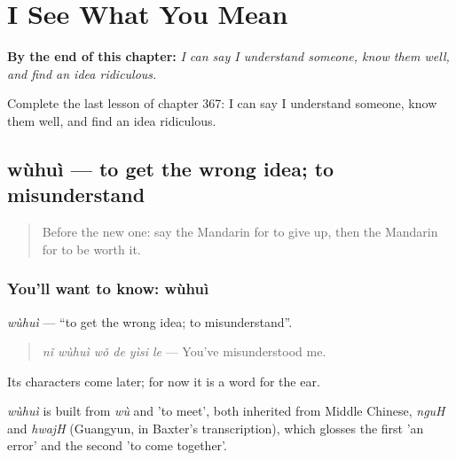 
\chapter{I See What You Mean}
\label{ch:zh-i-see-what-you-mean}

\begin{chapteropening}
\textbf{By the end of this chapter:} \emph{I can say I understand someone, know them well, and find an idea ridiculous.}

Complete the last lesson of chapter 367: I can say I understand someone, know them well, and find an idea ridiculous.
\end{chapteropening}

\section[wùhuì]{wùhuì — to get the wrong idea; to misunderstand}

\label{lesson:ZH-C367-wuhui}



\begin{quote}
Before the new one: say the Mandarin for to give up, then the Mandarin for to be worth it.
\end{quote}

\subsection*{You'll want to know: wùhuì}
\emph{wùhuì} — \textquotedblleft{}to get the wrong idea; to misunderstand\textquotedblright{}.

\begin{quote}
\emph{nǐ wùhuì wǒ de yìsi le} — You've misunderstood me.
\end{quote}

Its characters come later; for now it is a word for the ear.

\begin{cousinweb}
\emph{wùhuì} is built from \emph{wù} and  'to meet', both inherited from Middle Chinese, \emph{nguH} and \emph{hwajH} (Guangyun, in Baxter's transcription), which glosses the first 'an error' and the second 'to come together'.
\end{cousinweb}

